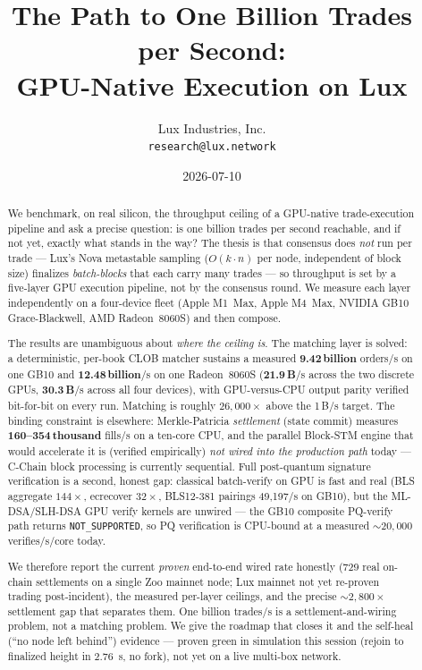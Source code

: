 \documentclass[11pt,a4paper]{article}
\title{The Path to One Billion Trades per Second:\\
       GPU-Native Execution on Lux}
\author{Lux Industries, Inc. \\
        \texttt{research@lux.network}}
\date{2026-07-10}
\begin{document}
\luxcoverpage

\begin{abstract}
We benchmark, on real silicon, the throughput ceiling of a GPU-native
trade-execution pipeline and ask a precise question: is one billion
trades per second reachable, and if not yet, exactly what stands in the
way? The thesis is that consensus does \emph{not} run per trade --- Lux's
Nova metastable sampling ($O(k\cdot n)$ per node, independent of block
size) finalizes \emph{batch-blocks} that each carry many trades --- so
throughput is set by a five-layer GPU execution pipeline, not by the
consensus round. We measure each layer independently on a four-device
fleet (Apple M1~Max, Apple M4~Max, NVIDIA GB10 Grace-Blackwell, AMD
Radeon~8060S) and then compose.

The results are unambiguous about \emph{where the ceiling is}. The
matching layer is solved: a deterministic, per-book CLOB matcher sustains
a measured \textbf{9.42\,billion} orders/s on one GB10 and
\textbf{12.48\,billion}/s on one Radeon~8060S (\textbf{21.9\,B}/s across
the two discrete GPUs, \textbf{30.3\,B}/s across all four devices), with
GPU-versus-CPU output parity verified bit-for-bit on every run. Matching
is roughly $26{,}000\times$ above the 1\,B/s target. The binding
constraint is elsewhere: Merkle-Patricia \emph{settlement} (state
commit) measures \textbf{160--354\,thousand} fills/s on a ten-core CPU,
and the parallel Block-STM engine that would accelerate it is (verified
empirically) \emph{not wired into the production path} today ---
C-Chain block processing is currently sequential. Full post-quantum
signature verification is a second, honest gap: classical batch-verify
on GPU is fast and real (BLS aggregate $144\times$, ecrecover $32\times$,
BLS12-381 pairings 49{,}197/s on GB10), but the ML-DSA/SLH-DSA GPU
verify kernels are unwired --- the GB10 composite PQ-verify path returns
\texttt{NOT\_SUPPORTED}, so PQ verification is CPU-bound at a measured
${\sim}20{,}000$ verifies/s/core today.

We therefore report the current \emph{proven} end-to-end wired rate
honestly (729 real on-chain settlements on a single Zoo mainnet node;
Lux mainnet not yet re-proven trading post-incident), the measured
per-layer ceilings, and the precise ${\sim}2{,}800\times$ settlement gap
that separates them. One billion trades/s is a settlement-and-wiring
problem, not a matching problem. We give the roadmap that closes it and
the self-heal (``no node left behind'') evidence --- proven green in
simulation this session (rejoin to finalized height in \SI{2.76}{\second},
no fork), not yet on a live multi-box network.
\end{abstract}
\end{document}
